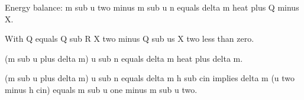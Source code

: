 Energy balance: m sub u two minus m sub u n equals delta m heat plus Q minus X.

With Q equals Q sub R X two minus Q sub us X two less than zero.

(m sub u plus delta m) u sub n equals delta m heat plus delta m.

(m sub u plus delta m) u sub n equals delta m h sub cin implies delta m (u two minus h cin) equals m sub u one minus m sub u two.